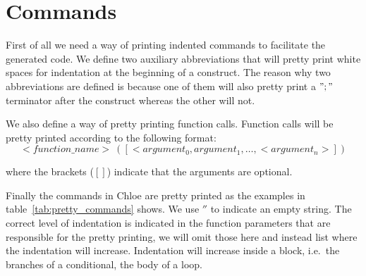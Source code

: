 \section{Commands}
First of all we need a way of printing indented commands to facilitate the generated code.
We define two auxiliary abbreviations that will pretty print white spaces for indentation at the beginning of a construct.
The reason why two abbreviations are defined is because one of them will also pretty print a $";"$ terminator after the construct whereas the other will not.

We also define a way of pretty printing function calls.
Function calls will be pretty printed according to the following format:
\begin{equation*}
<function\_name>\ ([<argument_0, argument_1, \dots, <argument_n>])
\end{equation*}

where the brackets ($[]$) indicate that the arguments are optional.

Finally the commands in Chloe are pretty printed as the examples in table~\ref{tab:pretty_commands} shows.
We use $''$ to indicate an empty string.
The correct level of indentation is indicated in the function parameters that are responsible for the pretty printing, we will omit those here and instead list where the indentation will increase.
Indentation will increase inside a block, i.e.\ the branches of a conditional, the body of a loop.


